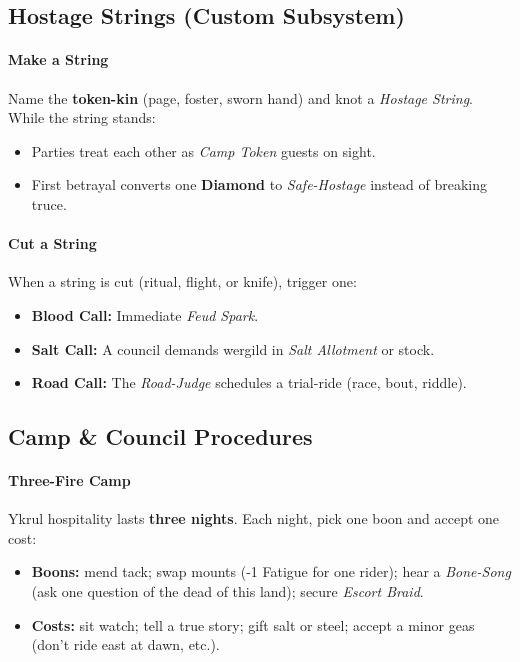 \subsection*{Hostage Strings (Custom Subsystem)}

\paragraph{Make a String}
Name the \textbf{token-kin} (page, foster, sworn hand) and knot a \emph{Hostage String}.  
While the string stands:
\begin{itemize}
\item Parties treat each other as \emph{Camp Token} guests on sight.
\item First betrayal converts one \textbf{Diamond} to \emph{Safe-Hostage} instead of breaking truce.
\end{itemize}

\paragraph{Cut a String}
When a string is cut (ritual, flight, or knife), trigger one:
\begin{itemize}
\item \textbf{Blood Call:} Immediate \emph{Feud Spark}.
\item \textbf{Salt Call:} A council demands wergild in \emph{Salt Allotment} or stock.
\item \textbf{Road Call:} The \emph{Road-Judge} schedules a trial-ride (race, bout, riddle).
\end{itemize}
\subsection*{Camp \& Council Procedures}

\paragraph{Three-Fire Camp}
Ykrul hospitality lasts \textbf{three nights}. Each night, pick one boon and accept one cost:
\begin{itemize}
\item \textbf{Boons:} mend tack; swap mounts (-1 Fatigue for one rider); hear a \emph{Bone-Song} (ask one question of the dead of this land); secure \emph{Escort Braid}.
\item \textbf{Costs:} sit watch; tell a true story; gift salt or steel; accept a minor geas (don’t ride east at dawn, etc.).
\end{itemize}

